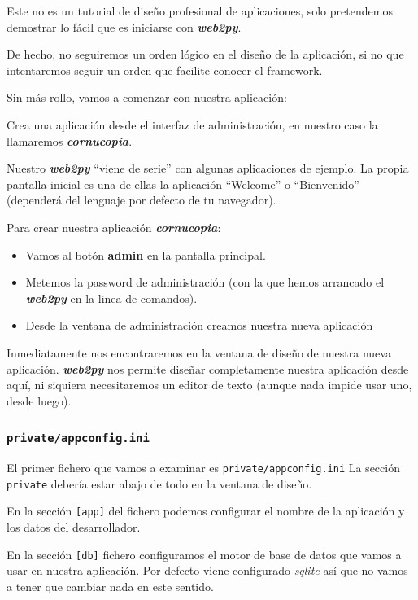 \documentclass[
  12pt,
  spanish,
]{article}
\providecommand{\tightlist}{%
  \setlength{\itemsep}{0pt}\setlength{\parskip}{0pt}}
\begin{document}
Este no es un tutorial de diseño profesional de aplicaciones, solo
pretendemos demostrar lo fácil que es iniciarse con
\textbf{\emph{web2py}}.

De hecho, no seguiremos un orden lógico en el diseño de la aplicación,
si no que intentaremos seguir un orden que facilite conocer el
framework.

Sin más rollo, vamos a comenzar con nuestra aplicación:

Crea una aplicación desde el interfaz de administración, en nuestro caso
la llamaremos \textbf{\emph{cornucopia}}.

Nuestro \textbf{\emph{web2py}} ``viene de serie'' con algunas
aplicaciones de ejemplo. La propia pantalla inicial es una de ellas la
aplicación ``Welcome'' o ``Bienvenido'' (dependerá del lenguaje por
defecto de tu navegador).

Para crear nuestra aplicación \textbf{\emph{cornucopia}}:

\begin{itemize}
\tightlist
\item
  Vamos al botón \textbf{admin} en la pantalla principal.
\item
  Metemos la password de administración (con la que hemos arrancado el
  \textbf{\emph{web2py}} en la linea de comandos).
\item
  Desde la ventana de administración creamos nuestra nueva aplicación
\end{itemize}

Inmediatamente nos encontraremos en la ventana de diseño de nuestra
nueva aplicación. \textbf{\emph{web2py}} nos permite diseñar
completamente nuestra aplicación desde aquí, ni siquiera necesitaremos
un editor de texto (aunque nada impide usar uno, desde luego).

\hypertarget{privateappconfig.ini}{%
\subsubsection{\texorpdfstring{\texttt{private/appconfig.ini}}{private/appconfig.ini}}\label{privateappconfig.ini}}

El primer fichero que vamos a examinar es \texttt{private/appconfig.ini}
La sección \texttt{private} debería estar abajo de todo en la ventana de
diseño.

En la sección \texttt{{[}app{]}} del fichero podemos configurar el
nombre de la aplicación y los datos del desarrollador.

En la sección \texttt{{[}db{]}} fichero configuramos el motor de base de
datos que vamos a usar en nuestra aplicación. Por defecto viene
configurado \emph{sqlite} así que no vamos a tener que cambiar nada en
este sentido.
\end{document}
